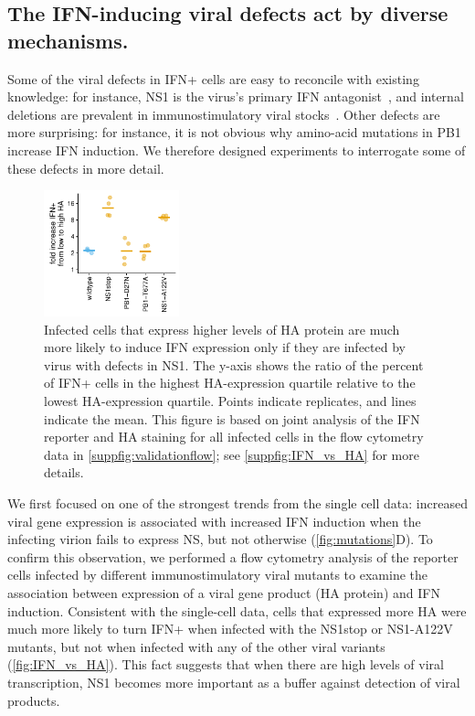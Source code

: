 \documentclass[]{asm-article}
\newcommand{\FIG}[1]{\autoref{fig:#1}}
\newcommand{\SUPPFIG}[1]{\autoref{suppfig:#1}}
\begin{document}
\subsection{The IFN-inducing viral defects act by diverse mechanisms.}
Some of the viral defects in IFN+ cells are easy to reconcile with existing knowledge: for instance, NS1 is the virus's primary IFN antagonist~\cite{garcia1998influenza, hale2008multifunctional}, and internal deletions are prevalent in immunostimulatory viral stocks~\cite{wang2018cell, baum2010preference, tapia2013defective, boergeling2015evidence, dimmock2015cloned, liu2019inhibition}.
Other defects are more surprising: for instance, it is not obvious why amino-acid mutations in PB1 increase IFN induction.
We therefore designed experiments to interrogate some of these defects in more detail.

\begin{figure}
\centerline{\includegraphics[width=0.35\textwidth, valign=t]{figures/MutantComparison/p_foldchange.pdf}}
\caption{
Infected cells that express higher levels of HA protein are much more likely to induce IFN expression only if they are infected by virus with defects in NS1.
The y-axis shows the ratio of the percent of IFN+ cells in the highest HA-expression quartile relative to the lowest HA-expression quartile.
Points indicate replicates, and lines indicate the mean.
This figure is based on joint analysis of the IFN reporter and HA staining for all infected cells in the flow cytometry data in \SUPPFIG{validationflow}; see \SUPPFIG{IFN_vs_HA} for more details.
}
\label{fig:IFN_vs_HA}
\end{figure}

We first focused on one of the strongest trends from the single cell data: increased viral gene expression is associated with increased IFN induction when the infecting virion fails to express NS, but not otherwise (\FIG{mutations}D).
To confirm this observation, we performed a flow cytometry analysis of the reporter cells infected by different immunostimulatory viral mutants to examine the association between expression of a viral gene product (HA protein) and IFN induction.  
Consistent with the single-cell data, cells that expressed more HA were much more likely to turn IFN+ when infected with the NS1stop or NS1-A122V mutants, but not when infected with any of the other viral variants (\FIG{IFN_vs_HA}). 
This fact suggests that when there are high levels of viral transcription, NS1 becomes more important as a buffer against detection of viral products.
\end{document}
